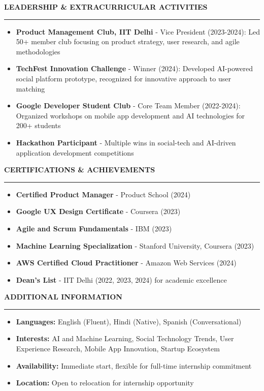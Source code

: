 \documentclass[11pt,a4paper]{article}
\newcommand{\resumesection}[1]{
    \vspace{8pt}
    \textcolor{primarycolor}{\textbf{\Large #1}}
    \vspace{2pt}
    \hrule
    \vspace{6pt}
}
\begin{document}
\resumesection{LEADERSHIP \& EXTRACURRICULAR ACTIVITIES}
\begin{itemize}[leftmargin=15pt, itemsep=2pt]
    \item \textbf{Product Management Club, IIT Delhi} - Vice President (2023-2024): Led 50+ member club focusing on product strategy, user research, and agile methodologies
    \item \textbf{TechFest Innovation Challenge} - Winner (2024): Developed AI-powered social platform prototype, recognized for innovative approach to user matching
    \item \textbf{Google Developer Student Club} - Core Team Member (2022-2024): Organized workshops on mobile app development and AI technologies for 200+ students
    \item \textbf{Hackathon Participant} - Multiple wins in social-tech and AI-driven application development competitions
\end{itemize}

\resumesection{CERTIFICATIONS \& ACHIEVEMENTS}
\begin{itemize}[leftmargin=15pt, itemsep=2pt]
    \item \textbf{Certified Product Manager} - Product School (2024)
    \item \textbf{Google UX Design Certificate} - Coursera (2023)
    \item \textbf{Agile and Scrum Fundamentals} - IBM (2023)
    \item \textbf{Machine Learning Specialization} - Stanford University, Coursera (2023)
    \item \textbf{AWS Certified Cloud Practitioner} - Amazon Web Services (2024)
    \item \textbf{Dean's List} - IIT Delhi (2022, 2023, 2024) for academic excellence
\end{itemize}

\resumesection{ADDITIONAL INFORMATION}
\begin{itemize}[leftmargin=15pt, itemsep=2pt]
    \item \textbf{Languages:} English (Fluent), Hindi (Native), Spanish (Conversational)
    \item \textbf{Interests:} AI and Machine Learning, Social Technology Trends, User Experience Research, Mobile App Innovation, Startup Ecosystem
    \item \textbf{Availability:} Immediate start, flexible for full-time internship commitment
    \item \textbf{Location:} Open to relocation for internship opportunity
\end{itemize}
\end{document}
